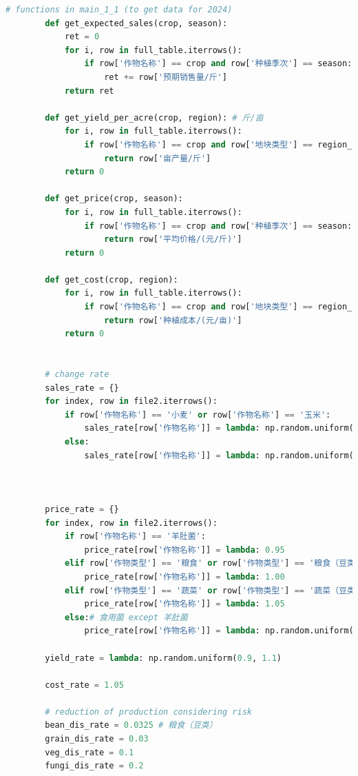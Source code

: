 \documentclass[withoutpreface]{cumcmthesis}
\begin{document}
\begin{appendices}
\begin{lstlisting}[language=python]
        # functions in main_1_1 (to get data for 2024)
        def get_expected_sales(crop, season):
            ret = 0
            for i, row in full_table.iterrows():
                if row['作物名称'] == crop and row['种植季次'] == season:
                    ret += row['预期销售量/斤']
            return ret
    
        def get_yield_per_acre(crop, region): # 斤/亩
            for i, row in full_table.iterrows():
                if row['作物名称'] == crop and row['地块类型'] == region_to_type[region]:
                    return row['亩产量/斤']
            return 0
        
        def get_price(crop, season):
            for i, row in full_table.iterrows():
                if row['作物名称'] == crop and row['种植季次'] == season:
                    return row['平均价格/(元/斤)']
            return 0
    
        def get_cost(crop, region):
            for i, row in full_table.iterrows():
                if row['作物名称'] == crop and row['地块类型'] == region_to_type[region]:
                    return row['种植成本/(元/亩)']
            return 0
        
    
        # change rate
        sales_rate = {}
        for index, row in file2.iterrows():
            if row['作物名称'] == '小麦' or row['作物名称'] == '玉米':
                sales_rate[row['作物名称']] = lambda: np.random.uniform(1.05, 1.10)
            else:
                sales_rate[row['作物名称']] = lambda: np.random.uniform(0.95, 1.05) #! TODO: potential misunderstanding
    
        
    
        price_rate = {}
        for index, row in file2.iterrows():
            if row['作物名称'] == '羊肚菌':
                price_rate[row['作物名称']] = lambda: 0.95
            elif row['作物类型'] == '粮食' or row['作物类型'] == '粮食（豆类）':
                price_rate[row['作物名称']] = lambda: 1.00
            elif row['作物类型'] == '蔬菜' or row['作物类型'] == '蔬菜（豆类）':
                price_rate[row['作物名称']] = lambda: 1.05
            else:# 食用菌 except 羊肚菌
                price_rate[row['作物名称']] = lambda: np.random.uniform(0.95, 0.99)
        
        yield_rate = lambda: np.random.uniform(0.9, 1.1)
    
        cost_rate = 1.05
    
        # reduction of production considering risk
        bean_dis_rate = 0.0325 # 粮食（豆类）
        grain_dis_rate = 0.03
        veg_dis_rate = 0.1
        fungi_dis_rate = 0.2
    

\end{lstlisting}
\end{appendices}
\end{document}
